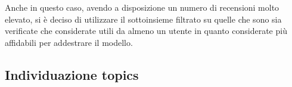 Anche in questo caso, avendo a disposizione un numero di recensioni molto elevato, si è deciso di utilizzare il sottoinsieme filtrato su quelle che sono sia verificate che considerate utili da almeno un utente in quanto considerate più affidabili per addestrare il modello. 


\subsection{Individuazione topics} %
